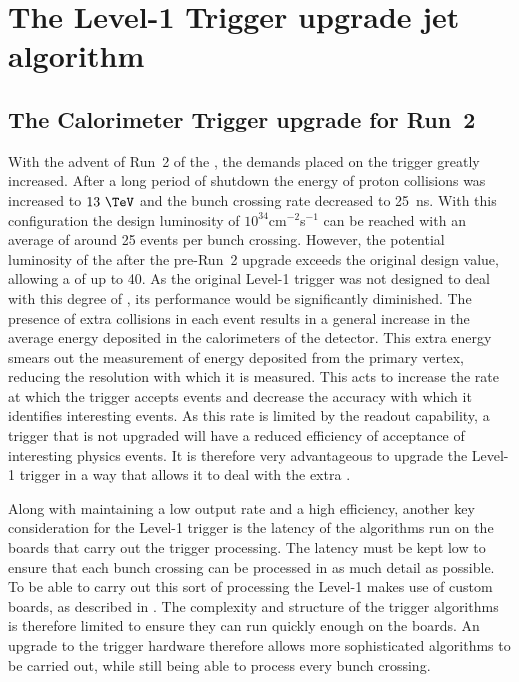 \chapter{The Level-1 Trigger upgrade jet algorithm}
\label{chap:l1trig}

\section{The Calorimeter Trigger upgrade for Run~2}
\label{sec:trigUpgrade}

With the advent of Run~2 of the \LHC, the demands placed on the \CMS
trigger greatly increased. After a long period of shutdown the energy
of proton collisions was increased to $13~\tev$ and the bunch crossing
rate decreased to 25~ns. With this configuration the design luminosity
of $10^{34}$cm$^{-2}$s$^{-1}$ can be reached with an average \PU of
around 25 events per bunch crossing. However, the potential luminosity
of the \LHC after the pre-Run~2 upgrade exceeds the original design
value, allowing a \PU of up to 40. As the original Level-1 trigger was
not designed to deal with this degree of \PU, its performance would be
significantly diminished. The presence of extra collisions in each
event results in a general increase in the average energy deposited in
the calorimeters of the detector. This extra energy smears out the
measurement of energy deposited from the primary vertex, reducing the resolution with
which it is measured. This acts to increase the rate at which the
trigger accepts events and decrease the accuracy with which it
identifies interesting events. As this rate is limited by the readout
capability, a trigger that is not upgraded will have a reduced
efficiency of acceptance of interesting physics events.  It is
therefore very advantageous to upgrade the Level-1 trigger in a way
that allows it to deal with the extra \PU \cite{Tapper:1556311}.

Along with maintaining a low output rate and a high efficiency,
another key consideration for the Level-1 trigger is the latency of
the algorithms run on the boards that carry out the trigger
processing. The latency must be kept low to ensure that each bunch
crossing can be processed in as much detail as possible. To be able to
carry out this sort of processing the Level-1 makes use of custom
\FPGA boards, as described in . The complexity and structure of the
trigger algorithms is therefore limited to ensure they can run quickly
enough on the \FPGA boards. An upgrade to the trigger hardware
therefore allows more sophisticated algorithms to be carried out,
while still being able to process every bunch crossing.

